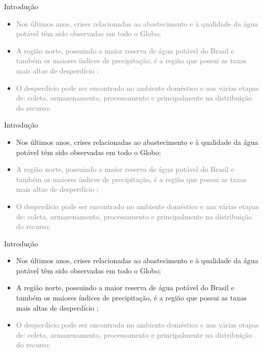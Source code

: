 \begin{frame}{Introdução}
\begin{itemize}
\item \textcolor{gray}{Nos últimos anos, crises relacionadas ao abastecimento e à qualidade da água potável têm sido observadas em todo o Globo;}
\item \textcolor{gray}{A região norte, possuindo a maior reserva de água potável do Brasil e também os maiores índices de precipitação, é a região que possui as taxas mais altas de desperdício \cite{globo};}
\item \textcolor{gray} {O desperdício pode ser encontrado no ambiente doméstico e nas várias etapas de: coleta, armazenamento, processamento e principalmente na distribuição do recurso;}
\end{itemize}
\end{frame}

\begin{frame}{Introdução}
    \begin{itemize}
    \item {Nos últimos anos, crises relacionadas ao abastecimento e à qualidade da água potável têm sido observadas em todo o Globo;}
    \item \textcolor{gray}{A região norte, possuindo a maior reserva de água potável do Brasil e também os maiores índices de precipitação, é a região que possui as taxas mais altas de desperdício \cite{globo};}
    \item \textcolor{gray} {O desperdício pode ser encontrado no ambiente doméstico e nas várias etapas de: coleta, armazenamento, processamento e principalmente na distribuição do recurso;}
    \end{itemize}
\end{frame}

\begin{frame}{Introdução}
    \begin{itemize}
    \item {Nos últimos anos, crises relacionadas ao abastecimento e à qualidade da água potável têm sido observadas em todo o Globo;}
    \item {A região norte, possuindo a maior reserva de água potável do Brasil e também os maiores índices de precipitação, é a região que possui as taxas mais altas de desperdício \cite{globo};}
    \item \textcolor{gray} {O desperdício pode ser encontrado no ambiente doméstico e nas várias etapas de: coleta, armazenamento, processamento e principalmente na distribuição do recurso;}
    \end{itemize}
\end{frame}

